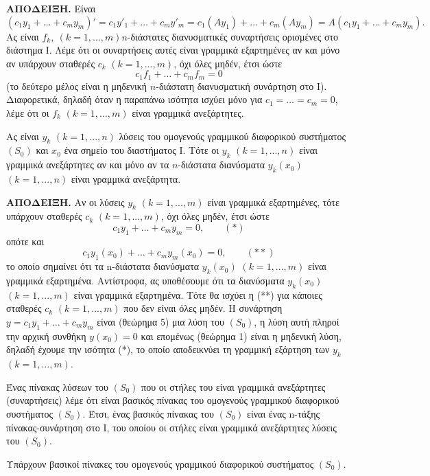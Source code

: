 \documentclass[11pt,a4paper,twoside]{book}
\newcommand{\titlefont}[1]{{\fontfamily{maksf}\selectfont #1}}
\newcounter{thewrhma}[chapter]
\renewcommand{\thethewrhma}{\thechapter.\arabic{thewrhma}}
\newcommand{\thewr}{\refstepcounter{thewrhma}{\bf\titlefont{\textcolor{secondarycolor}{\large Θεώρημα\hspace{2mm}\thethewrhma}}}\hspace{1mm}}{}
\newenvironment{Thewrhma}[1]
{\begin{tcolorbox}[title=\thewr\ \ :\ \  {\textcolor{black}{\bf{\large\titlefont{#1}}}},
breakable,
enhanced standard,
titlerule=-.2pt,
toprule=0pt, 
rightrule=0pt, 
bottomrule=0pt,
colback=white,
left=2mm,
top=1mm,
bottom=0mm,
boxrule=0pt,
colframe=white,
borderline west={1.5mm}{0pt}{secondarycolor},
leftrule=2mm,
sharp corners,
coltitle=secondarycolor]}
{\end{tcolorbox}}
\begin{document}
\textbf{ΑΠΟΔΕΙΞΗ.} Είναι
\[
(c_1 y_1 + \dots + c_m y_m)' = c_1 y'_1 + \dots + c_m y'_m = c_1 (Ay_1) + \dots + c_m (Ay_m) = A(c_1 y_1 + \dots + c_m y_m).
\]
Ας είναι $f_k,\ (k=1,...,m) n$-διάστατες διανυσματικές συναρτήσεις ορισμένες στο διάστημα Ι. Λέμε ότι οι συναρτήσεις αυτές είναι γραμμικά εξαρτημένες αν και μόνο αν υπάρχουν σταθερές $c_k$ $(k=1,...,m)$, όχι όλες μηδέν, έτσι ώστε
\[
c_1 f_1 + \dots + c_m f_m = 0
\]
(το δεύτερο μέλος είναι η μηδενική $n$-διάστατη διανυσματική συνάρτηση στο Ι). Διαφορετικά, δηλαδή όταν η παραπάνω ισότητα ισχύει μόνο για $c_1=\dots=c_m=0$, λέμε ότι οι $f_k$ $(k=1,...,m)$ είναι γραμμικά ανεξάρτητες.

\begin{Thewrhma}{}
Ας είναι $y_k$ $(k=1,...,n)$ λύσεις του ομογενούς γραμμικού διαφορικού συστήματος $(S_0)$ και $x_0$ ένα σημείο του διαστήματος Ι. Τότε οι $y_k$ $(k=1,...,n)$ είναι γραμμικά ανεξάρτητες αν και μόνο αν τα $n$-διάστατα διανύσματα $y_k(x_0)$ $(k=1,...,n)$ είναι γραμμικά ανεξάρτητα.
\end{Thewrhma}

\textbf{ΑΠΟΔΕΙΞΗ.} Αν οι λύσεις $y_k$ $(k=1,...,m)$ είναι γραμμικά εξαρτημένες, τότε υπάρχουν σταθερές $c_k$ $(k=1,...,m)$, όχι όλες μηδέν, έτσι ώστε
\begin{equation*}
c_1 y_1 + \dots + c_m y_m = 0, \qquad (*)
\end{equation*}
οπότε και
\begin{equation*}
c_1 y_1(x_0) + \dots + c_m y_m(x_0) = 0, \qquad (**)
\end{equation*}
το οποίο σημαίνει ότι τα n-διάστατα διανύσματα $y_k(x_0)$ $(k=1,...,m)$ είναι γραμμικά εξαρτημένα. Αντίστροφα, ας υποθέσουμε ότι τα διανύσματα $y_k(x_0)$ $(k=1,...,m)$ είναι γραμμικά εξαρτημένα. Τότε θα ισχύει η (**) για κάποιες σταθερές $c_k$ $(k=1,...,m)$ που δεν είναι όλες μηδέν. Η συνάρτηση $y = c_1 y_1 + \dots + c_m y_m$ είναι (θεώρημα 5) μια λύση του $(S_0)$, η λύση αυτή πληροί την αρχική συνθήκη $y(x_0)=0$ και επομένως (θεώρημα 1) είναι η μηδενική λύση, δηλαδή έχουμε την ισότητα (*), το οποίο αποδεικνύει τη γραμμική εξάρτηση των $y_k$ $(k=1,...,m)$.

Ένας πίνακας λύσεων του $(S_0)$ που οι στήλες του είναι γραμμικά ανεξάρτητες (συναρτήσεις) λέμε ότι είναι βασικός πίνακας του ομογενούς γραμμικού διαφορικού συστήματος $(S_0)$. Έτσι, ένας βασικός πίνακας του $(S_0)$ είναι ένας n-τάξης πίνακας-συνάρτηση στο Ι, του οποίου οι στήλες είναι γραμμικά ανεξάρτητες λύσεις του $(S_0)$.
\begin{Thewrhma}{}
Υπάρχουν βασικοί πίνακες του ομογενούς γραμμικού διαφορικού συστήματος $(S_0)$.
\end{Thewrhma}
\end{document}
